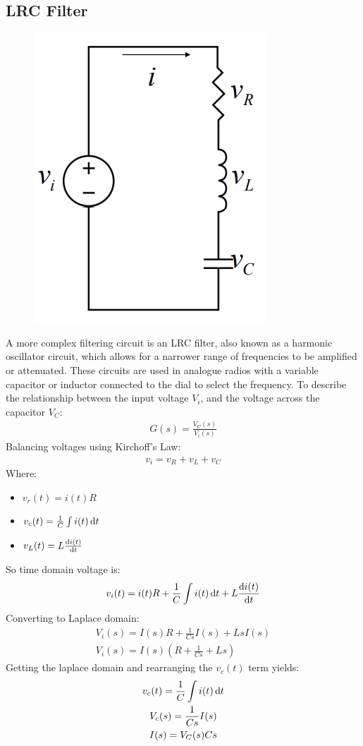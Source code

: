 \documentclass[class=report, crop=false, 12pt,a4paper]{standalone}
\begin{document}
\subsection*{LRC Filter}
\begin{figure}[H]
  \centering
  \includegraphics[width = 0.25 \textwidth]{../img/lrcfilter.PNG}
\end{figure}
A more complex filtering circuit is an LRC filter, also known as a harmonic oscillator circuit, which allows for a narrower range of frequencies to be amplified or attenuated. These circuits are used in analogue radios with a variable capacitor or inductor connected to the dial to select the frequency. To describe the relationship between the input voltage $V_i$, and the voltage across the capacitor $V_C$:
\begin{gather}
  G(s) = \frac{V_C(s)}{V_i(s)}
\end{gather}
Balancing voltages using Kirchoff's Law:
\begin{gather}
  v_i = v_R + v_L + v_C
\end{gather}
Where:
\begin{itemize}
  \item $v_r(t) = i(t)R$
  \item $v_c(t) = \frac{1}{C}\int i(t)\dif t$
  \item $v_L(t) = L\frac{\dif i(t)}{\dif t}$
\end{itemize}
So time domain voltage is:
\begin{gather}
  v_i(t) = i(t)R + \frac{1}{C}\int i(t)\dif t + L\frac{\dif i(t)}{\dif t}
\end{gather}
Converting to Laplace domain:
\begin{gather}
  V_i(s) = I(s)R + \frac{1}{Cs}I(s) + LsI(s) \\
  V_i(s) = I(s) \left(R + \frac{1}{Cs} + Ls\right)
  \label{laplacedomain1}
\end{gather}
Getting the laplace domain and rearranging the $v_c(t)$ term yields:
\begin{gather}
  v_c(t) = \frac{1}{C}\int i(t)\dif t \\
  V_c(s) = \frac{1}{Cs}I(s) \\
  I(s) = V_C(s)Cs \label{Is}
\end{gather}
\end{document}
